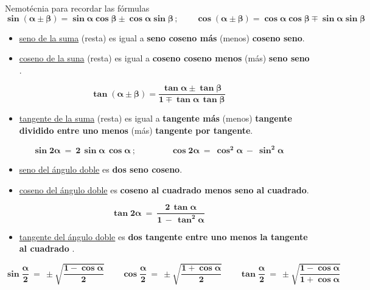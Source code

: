\vspace{5mm}
\begin{myexampleblock}{Nemotécnia para recordar las fórmulas}
\vspace{-5mm}
 $$\boldsymbol{ \sin(\alpha\pm\beta)  =  \sin \alpha  \cos \beta  \pm \cos \alpha \sin \beta }\, ; \qquad \boldsymbol{ \cos(\alpha \pm \beta)  =  \cos \alpha  \cos \beta   \mp  \sin \alpha  \sin \beta }$$
 
 \begin{itemize}
 \item \underline{seno de la suma} (resta) es igual a \textbf{seno coseno más} (menos) \textbf{coseno seno}.
 \item \underline{coseno de la suna} (resta) es igual a \textbf{coseno coseno menos} (más) \textbf{seno seno	}.
 \end{itemize}


\vspace{-3mm} $$\boldsymbol{ 
\tan (\alpha \pm \beta)  =  \dfrac {\tan \alpha \pm \tan \beta}{1 \mp \tan \alpha \, \tan \beta} }$$

\begin{itemize}
\item \underline{tangente de la suma} (resta) es igual a \textbf{tangente más} (menos) \textbf{tangente dividido entre uno menos} (más) \textbf{tangente por tangente}.	
\end{itemize}

 $$\boldsymbol{
 \sin 2 \alpha \ = \ 2 \, \sin \alpha \, \cos \alpha\ ; \qquad \qquad 
 \cos 2 \alpha \ = \ \cos^2 \alpha \ - \ \sin^2 \alpha}  $$
 
 \begin{itemize}
 \item \underline{seno del ángulo doble} es \textbf{dos seno coseno}.
 \item \underline{coseno del ángulo doble} es \textbf{coseno al cuadrado menos seno al cuadrado}.	
 \end{itemize}


\vspace{-3mm} $$\boldsymbol{  \tan 2 \alpha \ = \ \dfrac{2\, \tan \alpha}{1\, - \, \tan^2 \alpha}}$$

\begin{itemize}
\item \underline{tangente del ángulo doble} es \textbf{dos tangente entre uno menos la tangente al cuadrado	}.
\end{itemize}

\vspace{-3mm}
$$\boldsymbol{ 
 \sin \dfrac \alpha 2 \ = \ \pm\sqrt{\dfrac{1-\cos \alpha}{2}}  \qquad 
 \cos \dfrac \alpha 2 \ = \ \pm\sqrt{\dfrac{1+\cos \alpha}{2}}  \qquad 
 \tan \dfrac \alpha 2 \ = \ \pm\sqrt{\dfrac{1-\cos \alpha}{1+\cos \alpha}}   
}$$


\end{myexampleblock}
